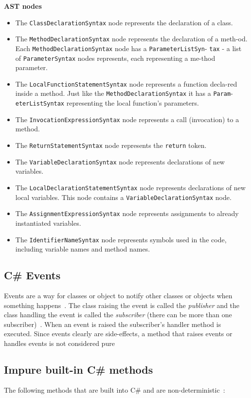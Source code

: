 \documentclass[a4paper,12pt]{article}
\begin{document}
\textbf{AST nodes}

\begin{itemize}
  \item The \texttt{ClassDeclarationSyntax} node represents the declaration of a class.
  \item The \texttt{MethodDeclarationSyntax} node represents the declaration of a meth-od. Each \texttt{MethodDeclarationSyntax} node has a \texttt{ParameterListSyn}- \texttt{tax} - a list of \texttt{ParameterSyntax} nodes represents, each representing a me-thod parameter.
  \item The \texttt{LocalFunctionStatementSyntax} node represents a function decla-red inside a method. Just like the \texttt{MethodDeclarationSyntax} it has a \texttt{Param}-\texttt{eterListSyntax} representing the local function's parameters.
  \item The \texttt{InvocationExpressionSyntax} node represents a call (invocation) to a method.
  \item The \texttt{ReturnStatementSyntax} node represents the \texttt{return} token.
  \item The \texttt{VariableDeclarationSyntax} node represents declarations of new variables.
  \item The \texttt{LocalDeclarationStatementSyntax} node represents declarations of new local variables. This node contains a \texttt{VariableDeclarationSyntax} node.
  \item The \texttt{AssignmentExpressionSyntax} node represents assignments to already instantiated variables.
  \item The \texttt{IdentifierNameSyntax} node represents symbols used in the code, including variable names and method names.
\end{itemize}

\subsection{C\# Events} \label{sub:Events}
Events are a way for classes or object to notify other classes or objects when something happens~\cite{microsoft-events}. The class raising the event is called the \textit{publisher} and the class handling the event is called the \textit{subscriber} (there can be more than one subscriber)~\cite{microsoft-events}. When an event is raised the subscriber's handler method is executed. Since events clearly are side-effects, a method that raises events or handles events is not considered pure

\subsection{Impure built-in C\# methods} \label{sub:Impure-built-in-methods}
The following methods that are built into C\# and are non-deterministic~\cite{dixin2015}:
\end{document}
